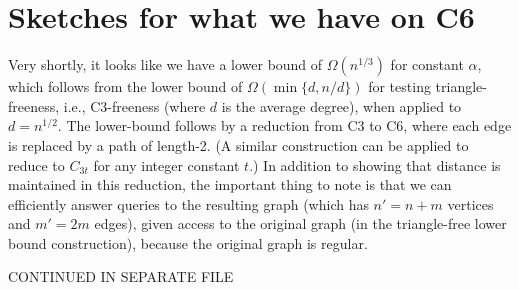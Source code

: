 \documentclass{article}
\begin{document}
\section{Sketches for what we have on C6}

Very shortly, it looks like we have a lower bound of $\Omega(n^{1/3})$ for constant $\alpha$, which follows from the lower bound of $\Omega(\min\{d,n/d\})$ for testing triangle-freeness, i.e., C3-freeness (where $d$ is the average degree), when applied to $d=n^{1/2}$. The lower-bound follows by a reduction from C3 to C6, where each edge is replaced by a path of length-2. (A similar construction can be applied to reduce to $C_{3t}$ for any integer constant $t$.) In addition to showing that distance is maintained in this reduction, the important thing to note is that we can efficiently answer queries to the resulting graph (which has $n'=n+m$ vertices and $m'=2m$ edges), given access to the original graph (in the triangle-free lower bound construction), because the original graph is regular.

CONTINUED IN SEPARATE FILE
\end{document}
